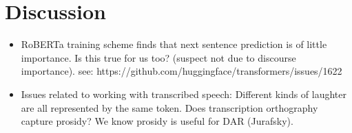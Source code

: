 \documentclass[11pt,a4paper]{article}
\begin{document}
\section{Discussion} %
\begin{itemize}
  \item RoBERTa training scheme finds that next sentence prediction is of little importance. Is this true for us too? (suspect not due to discourse importance). see: https://github.com/huggingface/transformers/issues/1622
  \item Issues related to working with transcribed speech: Different kinds of laughter are all represented by the same token. Does transcription orthography capture prosidy? We know prosidy is useful for DAR (Jurafsky).
\end{itemize}



\end{document}
